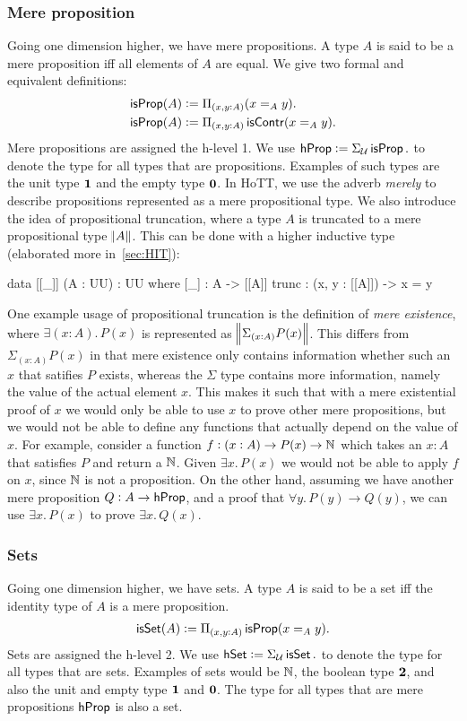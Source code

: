 \subsubsection{Mere proposition}
Going one dimension higher, we have mere propositions. A type $A$
is said to be a mere proposition iff all elements of $A$ are equal.
We give two formal and equivalent definitions:
\begin{align*}
    \operatorname{\mathsf{isProp}}(A) & := \Pi_{(x,y : A)}(x =_A y).\\
    \operatorname{\mathsf{isProp}}(A) & := \Pi_{(x,y : A)}\operatorname{\mathsf{isContr}}(x =_A y).\\
\end{align*}
Mere propositions are assigned the h-level 1.
We use $\mathsf{hProp} := \Sigma_{\mathcal{U}} \operatorname{\mathsf{isProp}}.$ to denote the type for
all types that are propositions.
Examples of such types
are the unit type ${\mathbf{1}}$ and the empty type ${\mathbf{0}}$. In HoTT,
we use the adverb \emph{merely} to describe propositions represented
as a mere propositional type. We also introduce the idea of
propositional truncation, where a type $A$ is truncated to 
a mere propositional type $\norm{A}$. This can be done with a higher
inductive type (elaborated more in~\cref{sec:HIT}):

\begin{code}
data [[_]] (A : UU) : UU where
    [_]  : A -> [[A]]
    trunc : (x, y : [[A]]) -> x = y
\end{code}
One example usage of propositional truncation is the definition of
\emph{mere existence}, where $\exists (x: A).\,P(x)$ is represented
as $\norm{\Sigma_{(x:A)}P(x)}$. This differs from $\Sigma_{(x:A)}P(x)$
in that mere existence only contains information whether such an $x$
that satifies $P$ exists, whereas the $\Sigma$ type contains more information,
namely the value of the actual element $x$. This makes it such that
with a mere existential proof of $x$ we would only be able to use $x$
to prove other mere propositions, but we would not be able to define
any functions that actually depend on the value of $x$. For example,
consider a function $f : (x : A) \to P(x) \to \mathbb{N}$ which takes an $x: A$
that satisfies $P$ and return a $\mathbb{N}$. Given $\exists x.\,P(x)$ we would
not be able to apply $f$ on $x$, since $\mathbb{N}$ is not a proposition. 
On the other hand, assuming we have another mere proposition
$Q : A \to \mathsf{hProp}$, and a proof that $\forall y.\,P(y) \to Q(y)$, 
we can use $\exists x.\,P(x)$ to prove $\exists x.\,Q(x)$.

\subsubsection{Sets}
Going one dimension higher, we have sets. A type $A$ is said to be a set
iff the identity type of $A$ is a mere proposition.
\begin{align*}
    \operatorname{\mathsf{isSet}}(A) := \Pi_{(x,y : A)}\operatorname{\mathsf{isProp}}(x =_A y).
\end{align*}
Sets are assigned the h-level 2.
We use $\mathsf{hSet} := \Sigma_{\mathcal{U}} \operatorname{\mathsf{isSet}}.$ to denote the type for
all types that are sets.
Examples of sets would be $\mathbb{N}$, the boolean type ${\mathbf{2}}$, and also
the unit and empty type ${\mathbf{1}}$ and ${\mathbf{0}}$. The type for all types
that are mere propositions $\mathsf{hProp}$ is also a set.

